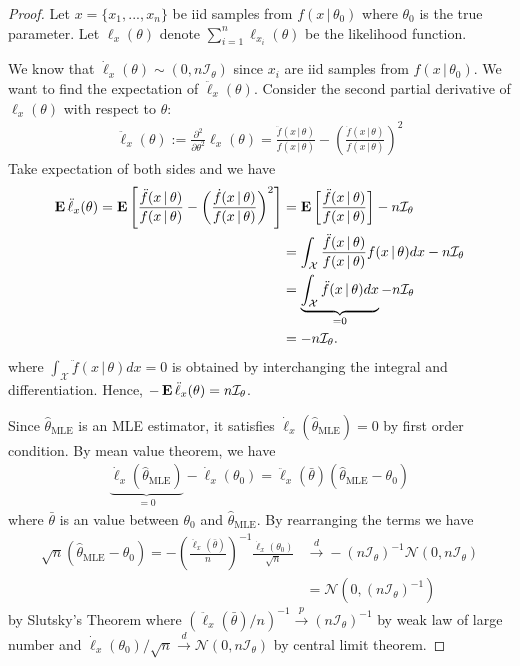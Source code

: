 \documentclass[a4paper,11pt]{article}
\DeclareMathOperator{\E}{\text{\textrm{\upshape\textbf{E}}}}
\newcommand{\pto}{\overset{p}{\longrightarrow}}
\newcommand{\dto}{\overset{d}{\longrightarrow}}
\newcommand{\given}[1][]{\,#1|\,}
\newcommand{\normal}[1]{\mathcal{N}\left(#1\right)}
\begin{document}
\begin{proof}
	Let $x=\{x_1,...,x_n\}$ be iid samples from $f(x\given\theta_0)$ where
	$\theta_0$ is the true parameter.
	Let $\ell_{x}(\theta)$ denote $\sum_{i=1}^{n}\ell_{x_i}(\theta)$ be
	the likelihood function.

	We know that $\dot\ell_{x}(\theta)\sim(0,n\mathcal{I}_{\theta})$
	since $x_i$ are iid samples from $f(x\given\theta_0)$.
	We want to find the expectation of $\ddot\ell_{x}(\theta)$.
	Consider the second partial derivative of $\ell_{x}(\theta)$
	with respect to $\theta$:
	\begin{align*}
		\ddot\ell_{x}(\theta)
		:= \frac{\partial^2}{\partial\theta^2} \ell_{x}(\theta)
		= \frac{\ddot f(x\given\theta)}{f(x\given\theta)}
		- \left(\frac{\dot f(x\given\theta)}{f(x\given\theta)}\right)^2
	\end{align*}
	Take expectation of both sides and we have
	\begin{align*}
		\E{\ddot\ell_{x}(\theta)}
		= \E\left[ \frac{\ddot f(x\given\theta)}{f(x\given\theta)}
		- \left(\frac{\dot f(x\given\theta)}{f(x\given\theta)}\right)^2 \right]
		&= \E\left[\frac{\ddot f(x\given\theta)}{f(x\given\theta)}\right]
		- n\mathcal{I}_{\theta} \\
		&= \int_{\mathcal{X}}
		\frac{\ddot f(x\given\theta)}{f(x\given\theta)}f(x\given\theta) d{x}
		- n\mathcal{I}_{\theta} \\
		&= \underbrace{\int_{\mathcal{X}} \ddot f(x\given\theta) d{x}}_{=0}
		- n\mathcal{I}_{\theta} \\
		&= - n\mathcal{I}_{\theta}.
	\end{align*}
	where $\int_{\mathcal{X}}\ddot f(x\given\theta)d{x}=0$ is obtained by
	interchanging the integral and differentiation.
	Hence, $-\E{\ddot\ell_{x}(\theta)}=n\mathcal{I}_{\theta}$.

	Since $\hat{\theta}_{\text{MLE}}$ is an MLE estimator, 
	it satisfies $\dot\ell_{x}(\hat{\theta}_{\text{MLE}})=0$ by first order condition.
	By mean value theorem, we have
	\begin{align*}
		\underbrace{\dot\ell_{x}(\hat{\theta}_{\text{MLE}})}_{=0}
		- \dot\ell_{x}(\theta_0)
		= \ddot\ell_{x}(\bar\theta)(\hat{\theta}_{\text{MLE}}-\theta_0)
	\end{align*}
	where $\bar{\theta}$ is an value between $\theta_0$ and $\hat{\theta}_{\text{MLE}}$.
	By rearranging the terms we have
	\begin{align*}
		\sqrt{n}(\hat{\theta}_{\text{MLE}}-\theta_0)
		= -\left(\frac{\ddot\ell_{x}(\bar\theta)}{n}\right)^{-1}
		\frac{\dot\ell_{x}(\theta_0)}{\sqrt{n}}
		&\dto -(n\mathcal{I}_{\theta})^{-1}\normal{0,n\mathcal{I}_{\theta}} \\
		&= \normal{0,(n\mathcal{I}_{\theta})^{-1}}
	\end{align*}
	by Slutsky's Theorem
	where $({\ddot\ell_{x}(\bar\theta)}/{n})^{-1}\pto(n\mathcal{I}_{\theta})^{-1}$
	by weak law of large number and
	${\dot\ell_{x}(\theta_0)}/{\sqrt{n}}\dto\normal{0,n\mathcal{I}_{\theta}}$
	by central limit theorem.
\end{proof}
\end{document}
